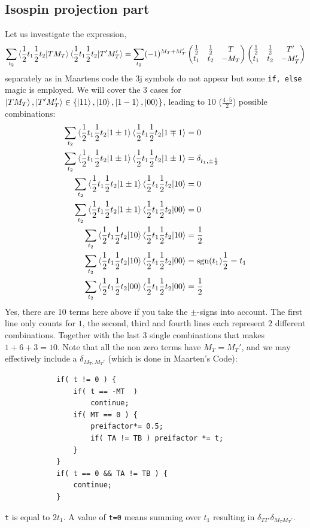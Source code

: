 \documentclass[10pt]{article}
\def\threej#1{\inthreej(#1)}
\def\inthreej(#1,#2,#3,#4,#5,#6){\begin{pmatrix}#1 & #2 & #3 \\ #4 & #5 & #6 \end{pmatrix}}
\begin{document}
\subsection{Isospin projection part}
Let us investigate the expression,
\begin{align*}
	\sum_{t_2} \braket{ \frac{1}{2} t_1 \frac{1}{2} t_2 | T M_T} \braket{ 
\frac{1}{2} t_1 \frac{1}{2} t_2 | T' M_T'} = \sum_{t_2} (-1)^{M_T + M_T' } 
\threej{ \frac{1}{2}, \frac{1}{2}, T, t_1,t_2, - M_T} \threej{ \frac{1}{2}, 
\frac{1}{2}, T', t_1,t_2, - M_T'}
\end{align*}
separately as in Maartens code the 3j symbols do not appear but some \texttt{if, 
else} magic is employed. We will cover the 3 cases for $\ket{ T M_T}, \ket{ T' 
M_T'} \in \{ \ket{1 1} , \ket{ 1 0 }, \ket{ 1 -1} , \ket{ 0 0} \}$, leading to 
10 ($\frac{ 4 \cdot 5}{2}$) possible combinations:
\begin{align*}
	\sum_{t_2} \braket{ \frac{1}{2} t_1 \frac{1}{2} t_2 | 1 \pm 1} \braket{ 
\frac{1}{2} t_1 \frac{1}{2} t_2 | 1 \mp 1 } &= 
	0 \\
	\sum_{t_2} \braket{ \frac{1}{2} t_1 \frac{1}{2} t_2 | 1 \pm 1} \braket{ 
\frac{1}{2} t_1 \frac{1}{2} t_2 | 1 \pm 1 } &=
	\delta_{t_1,\pm \frac{1}{2}} \\
	\sum_{t_2} \braket{ \frac{1}{2} t_1 \frac{1}{2} t_2 | 1 \pm 1} \braket{ 
\frac{1}{2} t_1 \frac{1}{2} t_2 | 1  0 } &=
	0 \\
	\sum_{t_2} \braket{ \frac{1}{2} t_1 \frac{1}{2} t_2 | 1 \pm 1} \braket{ 
\frac{1}{2} t_1 \frac{1}{2} t_2 | 0  0 } &=
	0 \\
	\sum_{t_2} \braket{ \frac{1}{2} t_1 \frac{1}{2} t_2 | 1  0} \braket{ 
\frac{1}{2} t_1 \frac{1}{2} t_2 | 1  0 } &= 				
\frac{1}{2} \\
	\sum_{t_2} \braket{ \frac{1}{2} t_1 \frac{1}{2} t_2 | 1  0} \braket{ 
\frac{1}{2} t_1 \frac{1}{2} t_2 | 0  0 } &=
	\text{sgn}(t_1) \frac{1}{2} = t_1 \\
	\sum_{t_2} \braket{ \frac{1}{2} t_1 \frac{1}{2} t_2 | 0  0} \braket{ \frac{1}{2} t_1 \frac{1}{2} t_2 | 0  0 } &=
	\frac{1}{2}
\end{align*}
Yes, there are 10 terms here above if you take the $\pm$-signs into account. The first line only counts for $1$, the second, third and fourth lines each represent $2$ different combinations. Together with the last $3$ single combinations that makes $ 1 + 6 + 3 = 10$. Note that all the non zero terms have $M_T=M_T'$, and we may effectively include a $\delta_{M_T,M_T'}$ (which is done in Maarten's Code):
\begin{verbatim}
            if( t != 0 ) {
                if( t == -MT  )
                    continue;
                if( MT == 0 ) {
                    preifactor*= 0.5;
                    if( TA != TB ) preifactor *= t;
                }
            }
            if( t == 0 && TA != TB ) {
                continue;
            }
\end{verbatim}
\texttt{t} is equal to $2 t_1$. A value of \texttt{t=0} means summing over $t_1$ resulting in $\delta_{T T'}\delta_{M_T M_T'}$.
\end{document}
